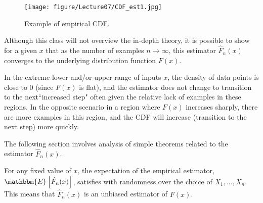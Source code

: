 \begin{figure}[htbp!]
	\centering
	\texttt{[image: figure/Lecture07/CDF\_est1.jpg]}
	\caption{Example of empirical CDF.} \label{fig:emp-cdf}
\end{figure}

Although this class will not overview the in-depth theory, it is possible to show for a given $x$ that as the number of examples $n \to \infty$, this estimator $\hat{F}_n(x)$  converges to the underlying distribution function $F(x)$. 

In the extreme lower and/or upper range of inputs $x$, the density of data points is close to 0 (since $F(x)$ is flat), and the estimator does not change to transition to the next``increased step" often given the relative lack of examples in these regions. In the opposite scenario in a region where $F(x)$ increases sharply, there are more examples in this region, and the CDF will increase (transition to the next step) more quickly. 

The following section involves analysis of simple theorems related to the estimator $\hat{F}_n(x)$.
\begin{theorem}
	For any fixed value of $x$, the expectation of the empirical estimator, $\mathbbm{E}\left[\hat{F}_n(x)\right]$, satisfies 
	 with randomness over the choice of $X_1, ..., X_n$. This means that $\hat{F}_n(x)$ is an unbiased estimator of $F(x)$.
\end{theorem}


